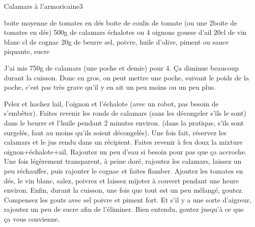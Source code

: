 \begin{recette}{Calamars à l'armoricaine}{3}{}{}
\begin{ingredients}
 boite moyenne de tomates en dés
 boite de coulis de tomate (ou une 2\ieme boite de tomates en dés)
\ingredient 500g de calamars
 échalotes
 ou 4 oignons
 gousse d'ail
\ingredient 20cl de vin blanc
 cl de cognac
\ingredient 20g de beurre
\ingredient sel, poivre, huile d'olive, piment ou sauce piquante, sucre
\end{ingredients}

\begin{remarque}
J'ai mis 750g de calamars (une poche et demie) pour 4. Ça diminue beaucoup durant la cuisson. Donc en gros, on peut mettre une poche, suivant le poids de la poche, c'est pas très grave qu'il y en ait un peu moins ou un peu plus.
\end{remarque}


\begin{preparation}
\etape Pelez et hachez lail, l'oignon et l'échalote (avec un robot, pas besoin de s'embêter).
\etape Faites revenir les ronds de calamars (sans les décongeler s'ils le sont) dans le beurre et l'huile pendant 2 minutes environ. (dans la pratique, s'ils sont surgelés, faut au moins qu'ils soient décongelés). Une fois fait, réservez les calamars et le jus rendu dans un récipient.
\etape Faites revenir à feu doux la mixture oignon+échalote+ail. Rajoutez un peu d'eau si besoin pour pas que ça accroche.
\etape Une fois légèrement transparent, à peine doré, rajoutez les calamars, laissez un peu réchauffer, puis rajouter le cognac et faites flamber.
\etape Ajoutez les tomates en dés, le vin blanc, salez, poivrez et laissez mijoter à couvert pendant une heure environ.
\etape Enfin, durant la cuisson, une fois que tout est un peu mélangé, goutez. Compensez les gouts avec sel poivre et piment fort. Et s'il y a une sorte d'aigreur, rajoutez un peu de sucre afin de l'éliminer. Bien entendu, goutez jusqu'à ce que ça vous convienne.
\end{preparation}

\end{recette}

